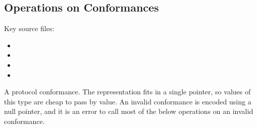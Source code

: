 \documentclass[../generics]{subfiles}
\begin{document}
\subsection*{Operations on Conformances}

Key source files:
\begin{itemize}
\item {}
\item {}
\item {}
\item {}
\end{itemize}

A protocol conformance. The representation fits in a single pointer, so values of this type are cheap to pass by value. An invalid conformance is encoded using a null pointer, and it is an error to call most of the below operations on an invalid conformance.
\end{document}
